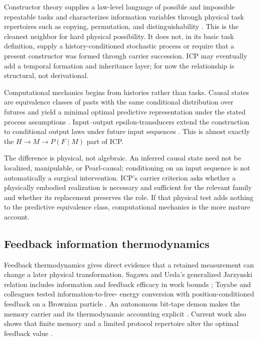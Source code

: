 Constructor theory supplies a law-level language of possible and impossible
repeatable tasks and characterizes information variables through physical task
repertoires such as copying, permutation, and distinguishability
\citep{Deutsch2013Constructor,DeutschMarletto2015Information}. This is the
cleanest neighbor for hard physical possibility. It does not, in its basic task
definition, supply a history-conditioned stochastic process or require that a
present constructor was formed through carrier succession. ICP may eventually
add a temporal formation and inheritance layer; for now the relationship is
structural, not derivational.

Computational mechanics begins from histories rather than tasks. Causal states
are equivalence classes of pasts with the same conditional distribution over
futures and yield a minimal optimal predictive representation under the stated
process assumptions \citep{ShaliziCrutchfield2001ComputationalMechanics}.
Input--output epsilon-transducers extend the construction to conditional output
laws under future input sequences \citep{BarnettCrutchfield2015Transducer}.
This is almost exactly the $H\rightarrow M\rightarrow P(F\mid M)$ part of
ICP.

The difference is physical, not algebraic. An inferred causal state need not be
localized, manipulable, or Pearl-causal; conditioning on an input sequence is
not automatically a surgical intervention. ICP's carrier criterion asks
whether a physically embodied realization is necessary and sufficient for the
relevant family and whether its replacement preserves the role. If that
physical test adds nothing to the predictive equivalence class, computational
mechanics is the more mature account.

\subsection{Feedback information thermodynamics}

Feedback thermodynamics gives direct evidence that a retained measurement can
change a later physical transformation. Sagawa and Ueda's generalized
Jarzynski relation includes information and feedback efficacy in work bounds
\citep{SagawaUeda2010Feedback}; Toyabe and colleagues tested information-to-free-
energy conversion with position-conditioned feedback on a Brownian particle
\citep{ToyabeEtAl2010InformationEnergy}. An autonomous bit-tape demon makes the
memory carrier and its thermodynamic accounting explicit
\citep{MandalJarzynski2012Demon}. Current work also shows that finite memory and
a limited protocol repertoire alter the optimal feedback value
\citep{HartleEtAl2026LimitedResources}.


